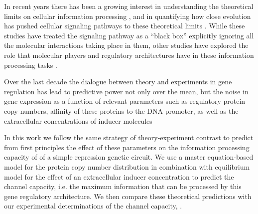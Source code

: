 In recent years there has been a growing interest in understanding the
theoretical limits on cellular information processing \cite{Bialek2005,
Gregor2007}, and in quantifying how close evolution has pushed cellular
signaling pathways to these theoretical limits \cite{Tkacik2008, Dubuis2013,
Petkova2016}. While these studies have treated the signaling pathway as a
``black box'' explicitly ignoring all the molecular interactions taking place in
them, other studies have explored the role that molecular players and regulatory
architectures have in these information processing tasks \cite{Ziv2007,
Voliotis2014, Tostevin2009, Tkacik2011, Tkacik2008a, Tabbaa2014}.

Over the last decade the dialogue between theory and experiments in gene
regulation has lead to predictive power not only over the mean, but the noise in
gene expression as a function of relevant parameters such as regulatory protein
copy numbers, affinity of these proteins to the DNA promoter, as well as the
extracellular concentrations of inducer molecules\cite{Jones2014a, Brewster2014,
Garcia2011c} 

In this work we follow the same strategy of theory-experiment contrast to
predict from first principles the effect of these parameters on the information
processing capacity of of a simple repression genetic circuit. We use a master
equation-based model for the protein copy number distribution in combination
with equilibrium model for the effect of an extracellular inducer concentration
to predict the channel capacity, i.e. the maximum information that can be
processed by this gene regulatory architecture. We then compare these
theoretical predictions with our experimental determinations of the channel
capacity, .


